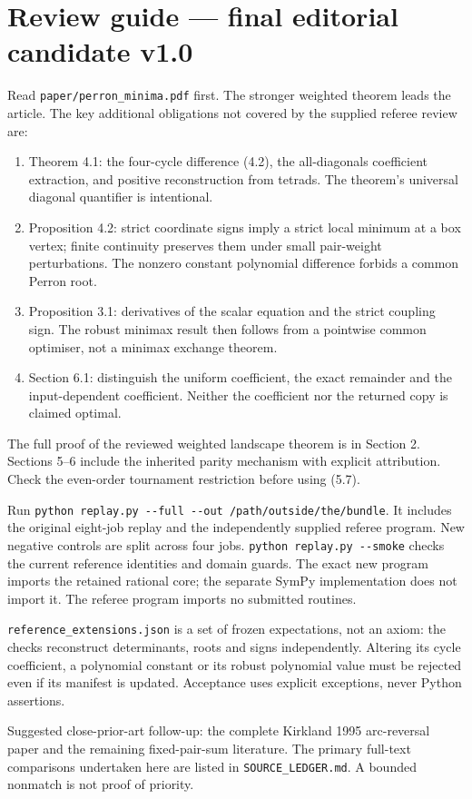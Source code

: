 \documentclass[
  11pt,
  a4paper,
]{article}
\author{}
\date{}
\providecommand{\tightlist}{%
  \setlength{\itemsep}{0pt}\setlength{\parskip}{0pt}}
\begin{document}
\section{Review guide --- final editorial candidate
v1.0}\label{review-guide-final-editorial-candidate-v1.0}

Read \texttt{paper/perron\_minima.pdf} first. The stronger weighted
theorem leads the article. The key additional obligations not covered by
the supplied referee review are:

\begin{enumerate}
\def\labelenumi{\arabic{enumi}.}
\tightlist
\item
  Theorem 4.1: the four-cycle difference (4.2), the all-diagonals
  coefficient extraction, and positive reconstruction from tetrads. The
  theorem's universal diagonal quantifier is intentional.
\item
  Proposition 4.2: strict coordinate signs imply a strict local minimum
  at a box vertex; finite continuity preserves them under small
  pair-weight perturbations. The nonzero constant polynomial difference
  forbids a common Perron root.
\item
  Proposition 3.1: derivatives of the scalar equation and the strict
  coupling sign. The robust minimax result then follows from a pointwise
  common optimiser, not a minimax exchange theorem.
\item
  Section 6.1: distinguish the uniform coefficient, the exact remainder
  and the input-dependent coefficient. Neither the coefficient nor the
  returned copy is claimed optimal.
\end{enumerate}

The full proof of the reviewed weighted landscape theorem is in Section
2. Sections 5--6 include the inherited parity mechanism with explicit
attribution. Check the even-order tournament restriction before using
(5.7).

Run
\texttt{python\ replay.py\ -\/-full\ -\/-out\ /path/outside/the/bundle}.
It includes the original eight-job replay and the independently supplied
referee program. New negative controls are split across four jobs.
\texttt{python\ replay.py\ -\/-smoke} checks the current reference
identities and domain guards. The exact new program imports the retained
rational core; the separate SymPy implementation does not import it. The
referee program imports no submitted routines.

\texttt{reference\_extensions.json} is a set of frozen expectations, not
an axiom: the checks reconstruct determinants, roots and signs
independently. Altering its cycle coefficient, a polynomial constant or
its robust polynomial value must be rejected even if its manifest is
updated. Acceptance uses explicit exceptions, never Python assertions.

Suggested close-prior-art follow-up: the complete Kirkland 1995
arc-reversal paper and the remaining fixed-pair-sum literature. The
primary full-text comparisons undertaken here are listed in
\texttt{SOURCE\_LEDGER.md}. A bounded nonmatch is not proof of priority.
\end{document}
